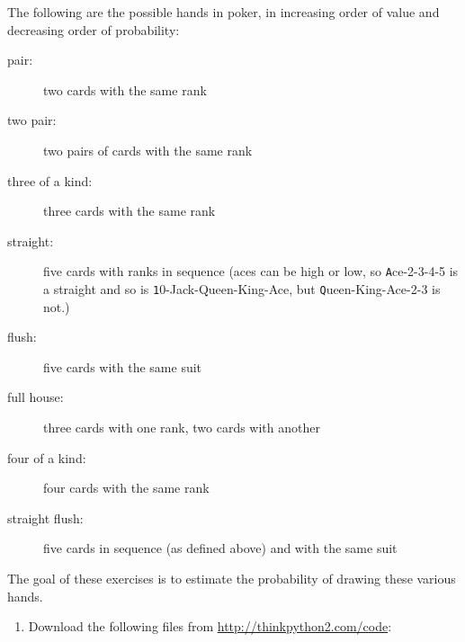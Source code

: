 \documentclass[
DIV=11,
fontsize=12,
twoside,
headinclude=false,
titlepage=firstiscover,
abstract=true,
headsepline=true,
footsepline=true,
chapterprefix=true, %
headings=big,
bibliography=totoc,%
captions=tableheading
]{scrbook}
\theoremstyle{definition}
\begin{document}
\begin{exercise}
\normalfont
\label{poker}

The following are the possible hands in poker, in increasing order
of value and decreasing order of probability:

\begin{description}

\item[pair:] two cards with the same rank
\vspace{-0.05in}

\item[two pair:] two pairs of cards with the same rank
\vspace{-0.05in}

\item[three of a kind:] three cards with the same rank
\vspace{-0.05in}

\item[straight:] five cards with ranks in sequence (aces can
be high or low, so {\texttt Ace-2-3-4-5} is a straight and so is {\texttt
10-Jack-Queen-King-Ace}, but {\texttt Queen-King-Ace-2-3} is not.)
\vspace{-0.05in}

\item[flush:] five cards with the same suit
\vspace{-0.05in}

\item[full house:] three cards with one rank, two cards with another
\vspace{-0.05in}

\item[four of a kind:] four cards with the same rank
\vspace{-0.05in}

\item[straight flush:] five cards in sequence (as defined above) and
with the same suit
\vspace{-0.05in}

\end{description}
%
The goal of these exercises is to estimate
the probability of drawing these various hands.

\begin{enumerate}

\item Download the following files from \url{http://thinkpython2.com/code}:

\begin{description}


\end{description}
\end{enumerate}
\end{exercise}
\end{document}

